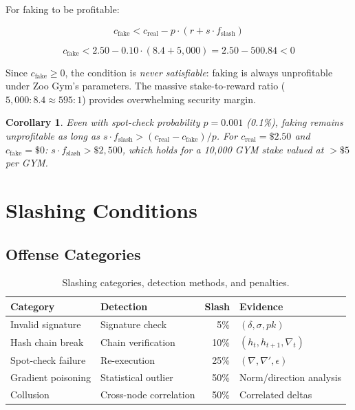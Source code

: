 \documentclass[11pt,letterpaper]{article}
\newtheorem{corollary}[theorem]{Corollary}
\begin{document}
For faking to be profitable:

\begin{equation}
    c_{\text{fake}} < c_{\text{real}} - p \cdot (r + s \cdot f_{\text{slash}})
\end{equation}

\begin{equation}
    c_{\text{fake}} < 2.50 - 0.10 \cdot (8.4 + 5{,}000) = 2.50 - 500.84 < 0
\end{equation}

Since $c_{\text{fake}} \geq 0$, the condition is \textit{never satisfiable}: faking is always unprofitable under Zoo Gym's parameters.  The massive stake-to-reward ratio ($5{,}000:8.4 \approx 595:1$) provides overwhelming security margin.

\begin{corollary}
Even with spot-check probability $p = 0.001$ (0.1\%), faking remains unprofitable as long as $s \cdot f_{\text{slash}} > (c_{\text{real}} - c_{\text{fake}}) / p$.  For $c_{\text{real}} = \$2.50$ and $c_{\text{fake}} = \$0$: $s \cdot f_{\text{slash}} > \$2{,}500$, which holds for a 10{,}000 GYM stake valued at $>\$5$ per GYM.
\end{corollary}

\section{Slashing Conditions}
\label{sec:slashing}

\subsection{Offense Categories}

\begin{table}[t]
\centering
\begin{tabular}{llrl}
\toprule
\textbf{Category} & \textbf{Detection} & \textbf{Slash} & \textbf{Evidence} \\
\midrule
Invalid signature & Signature check & 5\% & $(\delta, \sigma, pk)$ \\
Hash chain break & Chain verification & 10\% & $(h_t, h_{t+1}, \nabla_t)$ \\
Spot-check failure & Re-execution & 25\% & $(\nabla, \nabla', \epsilon)$ \\
Gradient poisoning & Statistical outlier & 50\% & Norm/direction analysis \\
Collusion & Cross-node correlation & 50\% & Correlated deltas \\
\bottomrule
\end{tabular}
\caption{Slashing categories, detection methods, and penalties.}
\label{tab:slashing}
\end{table}
\end{document}
